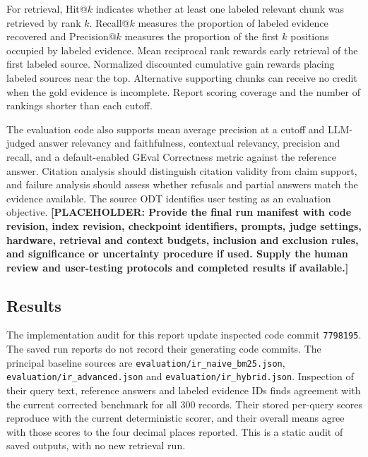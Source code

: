 \documentclass[oneside]{sn-jnl}
\newcommand{\pending}[1]{\textbf{\textcolor{red!65!black}{[PLACEHOLDER: #1]}}}
\newcommand{\artifact}[1]{\nolinkurl{#1}}
\begin{document}
For retrieval, Hit@$k$ indicates whether at least one labeled relevant chunk was retrieved by rank \(k\). Recall@$k$ measures the proportion of labeled evidence recovered and Precision@$k$ measures the proportion of the first \(k\) positions occupied by labeled evidence. Mean reciprocal rank rewards early retrieval of the first labeled source. Normalized discounted cumulative gain rewards placing labeled sources near the top. Alternative supporting chunks can receive no credit when the gold evidence is incomplete. Report scoring coverage and the number of rankings shorter than each cutoff.

The evaluation code also supports mean average precision at a cutoff and LLM-judged answer relevancy and faithfulness, contextual relevancy, precision and recall, and a default-enabled GEval Correctness metric against the reference answer. Citation analysis should distinguish citation validity from claim support, and failure analysis should assess whether refusals and partial answers match the evidence available. The source ODT identifies user testing as an evaluation objective.
\pending{Provide the final run manifest with code revision, index revision, checkpoint identifiers, prompts, judge settings, hardware, retrieval and context budgets, inclusion and exclusion rules, and significance or uncertainty procedure if used. Supply the human review and user-testing protocols and completed results if available.}

\subsection{Results}
The implementation audit for this report update inspected code commit \artifact{7798195}. The saved run reports do not record their generating code commits. The principal baseline sources are \artifact{evaluation/ir_naive_bm25.json}, \artifact{evaluation/ir_advanced.json} and \artifact{evaluation/ir_hybrid.json}. Inspection of their query text, reference answers and labeled evidence IDs finds agreement with the current corrected benchmark for all 300 records. Their stored per-query scores reproduce with the current deterministic scorer, and their overall means agree with those scores to the four decimal places reported. This is a static audit of saved outputs, with no new retrieval run.
\end{document}
